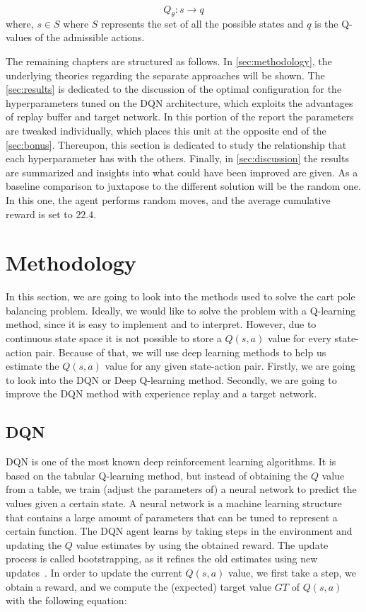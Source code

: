 \documentclass{article}
\begin{document}
\begin{equation}
    Q_{\theta} :  s \rightarrow q
    \label{eq:value-based-approach}
\end{equation}
where, $s \in S$ where $S$ represents the set of all the possible states and $q$ is the Q-values of the admissible actions.


The remaining chapters are structured as follows.
In \autoref{sec:methodology}, the underlying theories regarding the separate approaches will be shown.
The \autoref{sec:results} is dedicated to the discussion of the optimal configuration for the hyperparameters tuned on the DQN architecture, which exploits the advantages of replay buffer and target network.
In this portion of the report the parameters are tweaked individually, which places this unit at the opposite end of the \autoref{sec:bonus}.
Thereupon, this section is dedicated to study the relationship that each hyperparameter has with the others.
Finally, in \autoref{sec:discussion} the results are summarized and insights into what could have been improved are given.
As a baseline comparison to juxtapose to the different solution will be the random one.
In this one, the agent performs random moves, and the average cumulative reward is set to $22.4$.

\section{Methodology}
\label{sec:methodology}
In this section, we are going to look into the methods used to solve the cart pole balancing problem.
Ideally, we would like to solve the problem with a Q-learning method, since it is easy to implement and to interpret.
However, due to continuous state space it is not possible to store a $Q(s,a)$ value for every state-action pair.
Because of that, we will use deep learning methods to help us estimate the $Q(s,a)$ value for any given state-action pair.
Firstly, we are going to look into the DQN or Deep Q-learning method.
Secondly, we are going to improve the DQN method with experience replay and a target network.

\subsection{DQN}
\label{subsec:dqn}
DQN is one of the most known deep reinforcement learning algorithms.
It is based on the tabular Q-learning method, but instead of obtaining the $Q$ value from a table,
we train (adjust the parameters of) a neural network to predict the values given a certain state.
A neural network is a machine learning structure that contains a large amount of parameters that can be tuned
to represent a certain function.
The DQN agent learns by taking steps in the environment and updating the $Q$ value estimates by using the obtained reward.
The update process is called bootstrapping, as it refines the old estimates using new updates~\cite{DBLP:books/sp/Plaat22}.
In order to update the current $Q(s,a)$ value, we first take a step, we obtain a reward, and we compute the (expected) target value $GT$ of $Q(s,a)$ with the following equation:
\end{document}
